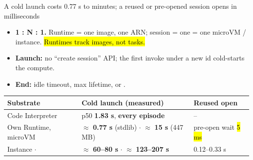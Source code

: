\begin{frame}{A cold launch costs 0.77 s to minutes; a reused or pre-opened session opens in milliseconds}
\begin{itemize}\footnotesize\setlength{\itemsep}{1mm}
\item \textbf{1 : N : 1.} Runtime = one image, one ARN; session = one  = one microVM / instance. \hl{Runtimes track images, not tasks.}
\item \textbf{Launch:} no ``create session'' API; the first invoke under a new id cold-starts the compute.
\item \textbf{End:} idle timeout, max lifetime, or .
\end{itemize}
\vspace{2mm}
\footnotesize
\begin{tabularx}{\textwidth}{@{}l Y l@{}}
\toprule
\textbf{Substrate} & \textbf{Cold launch (measured)} & \textbf{Reused open}\\
\midrule
Code Interpreter & p50 \textbf{1.83 s}, \textbf{every episode} & --\\
Own Runtime, microVM & $\approx$ \textbf{0.77 s} (stdlib) $\cdot$ $\approx$ \textbf{15 s} (447 MB) & pre-open wait \hl{5 ms}\\
Instance  $\cdot$  & $\approx$ \textbf{60--80 s} $\cdot$ $\approx$ \textbf{123--207 s} & 0.12--0.33 s\\
\bottomrule
\end{tabularx}
\end{frame}


